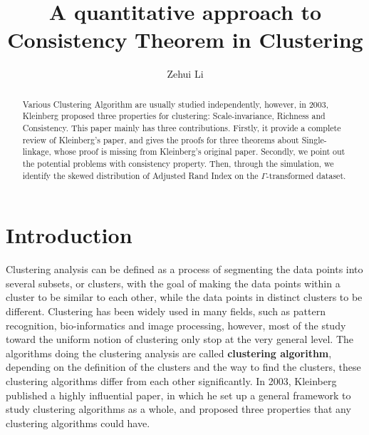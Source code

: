\documentclass{uonmathreport}
\title{A quantitative approach to Consistency Theorem in Clustering}
\author{Zehui Li}
\begin{document}
\maketitle

\begin{abstract}
Various Clustering Algorithm are usually studied independently, however, in 2003, Kleinberg\cite{Kleinberg} proposed three properties for clustering: Scale-invariance, Richness and Consistency. This paper mainly has three contributions. Firstly, it provide a complete review of Kleinberg's paper, and gives the proofs for three theorems about Single-linkage, whose proof is missing from Kleinberg's original paper. Secondly, we point out the potential problems with consistency property. Then, through the simulation, we identify the skewed distribution of Adjusted Rand Index on the $\Gamma$-transformed dataset. 
\end{abstract}

\setcounter{tocdepth}{2}  %
\tableofcontents 
\newpage

\section{Introduction} \label{sec:intro}

Clustering analysis can be defined as a process of segmenting the data points into several subsets, or clusters, with the goal of making the data points within a cluster to be similar to each other, while the data points in distinct clusters to be different. Clustering has been widely used in many fields, such as pattern recognition, bio-informatics and image processing, however, most of the study toward the uniform notion of clustering only stop at the very general level. The algorithms doing the clustering analysis are called \textbf{clustering algorithm}, depending on the definition of the clusters and the way to find the clusters, these clustering algorithms differ from each other significantly. In 2003, Kleinberg \cite{Kleinberg} published a highly influential paper, in which he set up a general framework to study clustering algorithms as a whole, and proposed three properties that any clustering algorithms could have.
\newline
\end{document}

